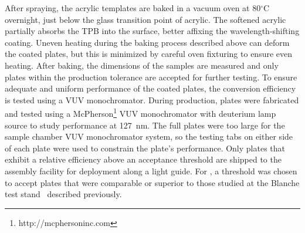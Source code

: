 After spraying, the acrylic templates are baked in a vacuum oven at 80$^{\circ}$C overnight, just below the glass transition point of acrylic. The softened acrylic partially absorbs the TPB into the surface, better affixing the wavelength-shifting coating. Uneven heating during the baking process described above can deform the coated plates, but this is minimized by careful oven fixturing to ensure even heating. After baking, the dimensions of the samples are measured and only plates within the production tolerance are accepted for further testing.
To ensure adequate and uniform performance of the coated plates, the conversion efficiency is tested using a VUV monochromator. During  production, plates were fabricated and tested 
using a McPherson\footnote{http://mcphersoninc.com} VUV monochromator with deuterium lamp source to study performance at \SI{127}{nm}. The full plates were too large for the sample chamber
VUV monochromator system, so the testing tabs on either side of each plate were used to constrain the plate's performance. 
Only plates that exhibit a relative efficiency above an acceptance threshold are shipped to the assembly facility for deployment along a light guide. For , a threshold was chosen to accept plates that were comparable or superior to those studied at the Blanche test stand~\cite{bib:DoubleShiftLG-NIM-171113} described previously.

